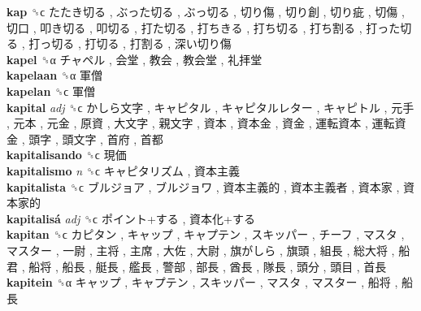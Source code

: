 \textbf{kap} ␝ϲ   たたき切る ,  ぶった切る ,  ぶっ切る ,  切り傷 ,  切り創 ,  切り疵 ,  切傷 ,  切口 ,  叩き切る ,  叩切る ,  打た切る ,  打ちきる ,  打ち切る ,  打ち割る ,  打った切る ,  打っ切る ,  打切る ,  打割る ,  深い切り傷   \\
\textbf{kapel} ␝α   チャペル ,  会堂 ,  教会 ,  教会堂 ,  礼拝堂   \\
\textbf{kapelaan} ␝α   軍僧   \\
\textbf{kapelan} ␝ϲ   軍僧   \\
\textbf{kapital} \emph{adj}  ␝ϲ   かしら文字 ,  キャピタル ,  キャピタルレター ,  キャピトル ,  元手 ,  元本 ,  元金 ,  原資 ,  大文字 ,  親文字 ,  資本 ,  資本金 ,  資金 ,  運転資本 ,  運転資金 ,  頭字 ,  頭文字 ,  首府 ,  首都   \\
\textbf{kapitalisando} ␝ϲ   現価   \\
\textbf{kapitalismo} \emph{n}  ␝ϲ   キャピタリズム ,  資本主義   \\
\textbf{kapitalista} ␝ϲ   ブルジョア ,  ブルジョワ ,  資本主義的 ,  資本主義者 ,  資本家 ,  資本家的   \\
\textbf{kapitalisá} \emph{adj}  ␝ϲ   ポイント+する ,  資本化+する   \\
\textbf{kapitan} ␝ϲ   カピタン ,  キャップ ,  キャプテン ,  スキッパー ,  チーフ ,  マスタ ,  マスター ,  一尉 ,  主将 ,  主席 ,  大佐 ,  大尉 ,  旗がしら ,  旗頭 ,  組長 ,  総大将 ,  船君 ,  船将 ,  船長 ,  艇長 ,  艦長 ,  警部 ,  部長 ,  酋長 ,  隊長 ,  頭分 ,  頭目 ,  首長   \\
\textbf{kapitein} ␝α   キャップ ,  キャプテン ,  スキッパー ,  マスタ ,  マスター ,  船将 ,  船長   \\

